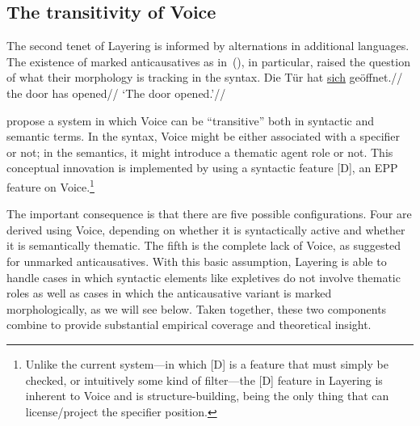 	\subsection{The transitivity of Voice} \label{aas:layering:features}
The second tenet of Layering is informed by alternations in additional languages. The existence of marked anticausatives as in~(\nextx), in particular, raised the question of what their morphology is tracking in the syntax.
\ex \begingl
	\gla Die T\"ur hat \underline{sich} ge\"offnet.//
	\glb the door has  opened//
	\glft `The door opened.'//
	\endgl
\xe

\cite{layering15} propose a system in which Voice can be ``transitive'' both in syntactic and semantic terms. In the syntax, Voice might be either associated with a specifier or not; in the semantics, it might introduce a thematic agent role or not. This conceptual innovation is implemented by using a syntactic feature [D], an EPP feature on Voice.\footnote{Unlike the current system---in which [D] is a feature that must simply be checked, or intuitively some kind of filter---the [D] feature in Layering is inherent to Voice and is structure-building, being the only thing that can license/project the specifier position.}

The important consequence is that there are five possible configurations. Four are derived using Voice, depending on whether it is syntactically active and whether it is semantically thematic. The fifth is the complete lack of Voice, as suggested for unmarked anticausatives. With this basic assumption, Layering is able to handle cases in which syntactic elements like expletives do not involve thematic roles as well as cases in which the anticausative variant is marked morphologically, as we will see below. Taken together, these two components combine to provide substantial empirical coverage and theoretical insight.

